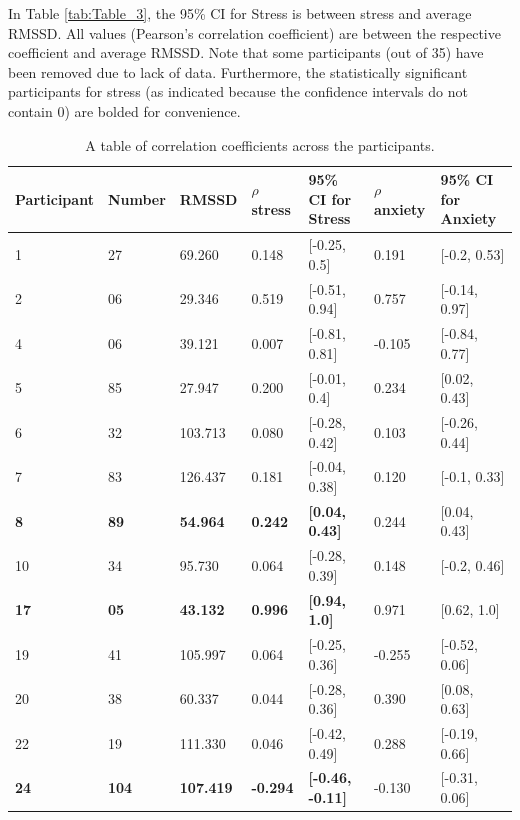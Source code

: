 \documentclass[11pt, a4paper, oneside]{article}
\begin{document}
In Table \ref{tab:Table_3}, the 95\% CI for Stress is between stress and average RMSSD. All \text{${\rho}$} values (Pearson's correlation coefficient) are between the respective coefficient and average RMSSD. Note that some participants (out of 35) have been removed due to lack of data. Furthermore, the statistically significant participants for stress (as indicated because the confidence intervals do not contain 0) are bolded for convenience.
\begin{table}[H]
    \centering
    \caption{A table of correlation coefficients across the participants.}
    \begin{tabularx}{\textwidth}{XXXXXXX}
        \toprule
        \textbf{Participant} & \textbf{Number} & \textbf{RMSSD} & \textbf{${\rho}$ stress} & \textbf{95\% CI for Stress} & \textbf{${\rho}$ anxiety} & \textbf{95\% CI for Anxiety}\\
        \midrule
        1    & 27   & 69.260  & 0.148 & [-0.25, 0.5] & 0.191 & [-0.2, 0.53]\\
        2    & 06   & 29.346  & 0.519 & [-0.51, 0.94]& 0.757 &[-0.14, 0.97]\\
        4    & 06   & 39.121  & 0.007 & [-0.81, 0.81] & -0.105 &[-0.84, 0.77]\\
        5    & 85   & 27.947  & 0.200 & [-0.01, 0.4] & 0.234 & [0.02, 0.43]\\
        6    & 32   & 103.713& 0.080 & [-0.28, 0.42] & 0.103 &[-0.26, 0.44]\\
        7    & 83   & 126.437 & 0.181 & [-0.04, 0.38] & 0.120 & [-0.1, 0.33]\\
        \textbf{8}    & \textbf{89}   & \textbf{54.964}   & \textbf{0.242} & \textbf{[0.04, 0.43]} & 0.244 & [0.04, 0.43]\\
        10  & 34   & 95.730   & 0.064 & [-0.28, 0.39] & 0.148 & [-0.2, 0.46]\\
        \textbf{17}  & \textbf{05}   & \textbf{43.132}    & \textbf{0.996} & \textbf{[0.94, 1.0]} & 0.971 & [0.62, 1.0]\\
        19  & 41   & 105.997 & 0.064 & [-0.25, 0.36] & -0.255 &[-0.52, 0.06]\\
        20  & 38   & 60.337   & 0.044 & [-0.28, 0.36] & 0.390 & [0.08, 0.63]\\
        22  & 19   & 111.330& 0.046 & [-0.42, 0.49] & 0.288 & [-0.19, 0.66]\\
        \textbf{24}  & \textbf{104} & \textbf{107.419}& \textbf{-0.294}& \textbf{[-0.46, -0.11]} & -0.130 & [-0.31, 0.06]\\

\end{tabularx}
\end{table}
\end{document}
